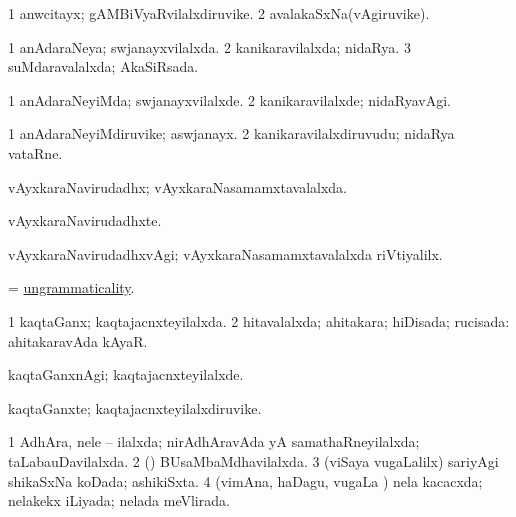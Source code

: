 \bentry
{} 
\gl{\nA}
\expl{}
\bmng
\bnum
\num{1} anwcitayx; gAMBiVyaRvilalxdiruvike. 
\num{2} avalakaSxNa(vAgiruvike). 
\enum
\emng
\eentry

\bentry
{} 
\gl{\gu}
\expl{}
\bmng
\bnum
\num{1} anAdaraNeya; swjanayxvilalxda. 
\num{2} kanikaravilalxda; nidaRya.
\num{3} suMdaravalalxda; AkaSiRsada. 
\enum
\emng
\eentry

\bentry
{} 
\gl{\kirxvi}
\expl{}
\bmng
\bnum
\num{1} anAdaraNeyiMda; swjanayxvilalxde. 
\num{2} kanikaravilalxde; nidaRyavAgi. 
\enum
\emng
\eentry

\bentry
{} 
\gl{\nA}
\expl{}
\bmng
\bnum
\num{1} anAdaraNeyiMdiruvike; aswjanayx. 
\num{2} kanikaravilalxdiruvudu; nidaRya vataRne. 
\enum
\emng
\eentry

\bentry
{} 
\gl{\gu}
\expl{}
\bmng
 vAyxkaraNavirudadhx; vAyxkaraNasamamxtavalalxda. 
\emng
\eentry

\bentry
{} 
\gl{\nA}
\expl{}
\bmng
 vAyxkaraNavirudadhxte. 
\emng
\eentry

\bentry
{} 
\gl{\kirxvi}
\expl{}
\bmng
 vAyxkaraNavirudadhxvAgi; vAyxkaraNasamamxtavalalxda riVtiyalilx. 
\emng
\eentry

\bentry
{} 
\gl{\nA}
\expl{}
\bmng
 = \hyperlink{ungrammaticality}{ungrammaticality}. 
\emng
\eentry

\bentry
{} 
\gl{\gu}
\expl{}
\bmng
\bnum
\num{1} kaqtaGanx; kaqtajacnxteyilalxda. 
\num{2} hitavalalxda; ahitakara; hiDisada; rucisada:  ahitakaravAda kAyaR. 
\enum
\emng
\eentry

\bentry
{} 
\gl{\kirxvi}
\expl{}
\bmng
 kaqtaGanxnAgi; kaqtajacnxteyilalxde. 
\emng
\eentry

\bentry
{} 
\gl{\nA}
\expl{}
\bmng
 kaqtaGanxte; kaqtajacnxteyilalxdiruvike. 
\emng
\eentry

\bentry
{} 
\gl{\gu}
\expl{}
\bmng
\bnum
\num{1} AdhAra, nele -- ilalxda; nirAdhAravAda yA samathaRneyilalxda; taLabauDavilalxda. 
\num{2} (\viduyx) BUsaMbaMdhavilalxda. 
\num{3} (viSaya \mo vugaLalilx) sariyAgi shikaSxNa koDada; ashikiSxta. 
\num{4} (vimAna, haDagu, \mo vugaLa \vi) nela kacacxda; nelakekx iLiyada; nelada meVlirada. 
\enum
\emng
\eentry

